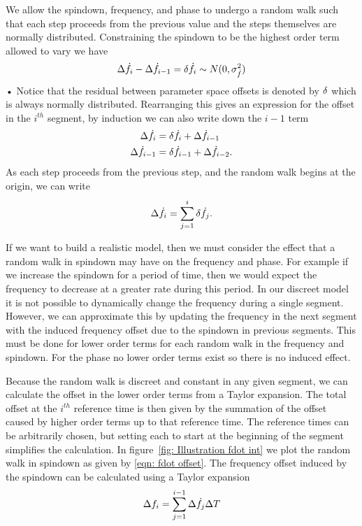 We allow the spindown, frequency, and phase to undergo a random walk such that
each step proceeds from the previous value and the steps themselves are
normally distributed. Constraining the spindown to be the highest order term
allowed to vary we have
\begin{equation}
\Delta \dot{f}_{i} - \Delta\dot{f}_{i-1} = \delta \dot{f}_{i} \sim N(0, \sigma_{\dot{f}}^{2})
\end{equation}•
Notice that the residual between parameter space offsets is denoted by $\delta$
which is always normally distributed. Rearranging this gives an expression for
the offset in the $i^{th}$ segment, by induction we can also write down the
$i-1$ term
\begin{align}
\Delta\dot{f}_{i} &  = \delta\dot{f}_{i} + \Delta\dot{f}_{i-1}  \\
\Delta\dot{f}_{i-1} &  = \delta\dot{f}_{i-1} + \Delta\dot{f}_{i-2}  .
\end{align}
As each step proceeds from the previous step, and the random walk begins at the
origin, we can write
\begin{equation} 
\Delta\dot{f}_{i} = \sum_{j=1}^{i}\delta\dot{f}_{j}.
\label{eqn: fdot offset} 
\end{equation}

If we want to build a realistic model, then we must consider the effect that a
random walk in spindown may have on the frequency and phase. For example if we
increase the spindown for a period of time, then we would expect the frequency
to decrease at a greater rate during this period. In our discreet model it is
not possible to dynamically change the frequency during a single segment.
However, we can approximate this by updating the frequency in the next
segment with the induced frequency offset due to the spindown in previous
segments. This must be done for lower order terms for each random walk in the
frequency and spindown. For the phase no lower order terms exist so there is no
induced effect.

Because the random walk is discreet and constant in any given segment, we can
calculate the offset in the lower order terms from a Taylor expansion. The
total offset at the  $i^{th}$ reference time is then given by the summation of
the offset caused by higher order terms up to that reference time. The reference times
can be arbitrarily chosen, but setting each to start at the beginning of the segment
simplifies the calculation.
In figure~\ref{fig: Illustration fdot int} we plot the random walk in spindown as given by 
\eqref{eqn: fdot offset}. The frequency offset induced by the spindown can be
calculated using a Taylor expansion
\begin{equation}
\Delta f_{i} = \sum_{j=1}^{i-1}\Delta\dot{f}_{j} \Delta T 
\label{eqn: f offset induced} 
\end{equation}

